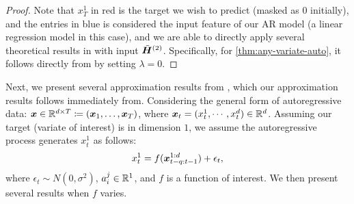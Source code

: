 \begin{proof}
Note that $x_T^1$ in red is the target we wish to predict (masked as 0 initially), and the entries in blue is considered the input feature of our AR model (a linear regression model in this case),
and we are able to directly apply several theoretical results in \cite{bai2024transformers} with input $\tilde{\bm{H}}^{(2)}$.
Specifically, for \cref{thm:any-variate-auto}, it follows directly from \citep[Theorem~4]{bai2024transformers} by setting $\lambda = 0$.

\end{proof}

Next, we present several approximation results from \cite{bai2024transformers}, which our approximation results follows immediately from.
Considering the general form of autoregressive data:
$\bm{x} \in \mathbb{R}^{d \times T} \coloneqq (\bm{x}_1, \dots, \bm{x}_T)$, where $\bm{x}_t = (x_t^1, \cdots, x_t^d) \in \mathbb{R}^d$.
Assuming our target (variate of interest) is in dimension $1$, we assume the autoregressive process generates $x_t^1$ as follows:
\begin{equation}
    x_{t}^1
    =
    f( \bm{x}_{t-q: t-1}^{1:d})
    +
    \epsilon_t
    ,
\end{equation}
where $\epsilon_t \sim N(0, \sigma^2)$, $a_i^j \in \mathbb{R}^1$, and $f$ is a function of interest.
We then present several results when $f$ varies.

